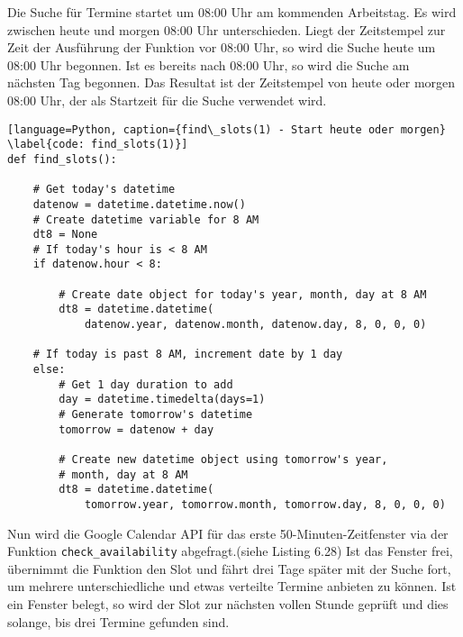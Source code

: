             Die Suche für Termine startet um 08:00 Uhr am kommenden Arbeitstag. Es wird zwischen heute und morgen 08:00 Uhr unterschieden. Liegt der Zeitstempel zur Zeit der Ausführung der Funktion vor 08:00 Uhr, so wird die Suche heute um 08:00 Uhr begonnen. Ist es bereits nach 08:00 Uhr, so wird die Suche am nächsten Tag begonnen. Das Resultat ist der Zeitstempel von heute oder morgen 08:00 Uhr, der als Startzeit für die Suche verwendet wird.

            \begin{lstlisting}[language=Python, caption={find\_slots(1) - Start heute oder morgen} \label{code: find_slots(1)}]
def find_slots():

    # Get today's datetime
    datenow = datetime.datetime.now()
    # Create datetime variable for 8 AM
    dt8 = None
    # If today's hour is < 8 AM
    if datenow.hour < 8:

        # Create date object for today's year, month, day at 8 AM
        dt8 = datetime.datetime(
            datenow.year, datenow.month, datenow.day, 8, 0, 0, 0)

    # If today is past 8 AM, increment date by 1 day
    else:
        # Get 1 day duration to add
        day = datetime.timedelta(days=1)
        # Generate tomorrow's datetime
        tomorrow = datenow + day

        # Create new datetime object using tomorrow's year, 
        # month, day at 8 AM
        dt8 = datetime.datetime(
            tomorrow.year, tomorrow.month, tomorrow.day, 8, 0, 0, 0)
            \end{lstlisting}

            Nun wird die Google Calendar API für das erste 50-Minuten-Zeitfenster via der Funktion \verb|check_availability| abgefragt.(siehe Listing 6.28) Ist das Fenster frei, übernimmt die Funktion den Slot und fährt drei Tage später mit der Suche fort, um mehrere unterschiedliche und etwas verteilte Termine anbieten zu können. Ist ein Fenster belegt, so wird der Slot zur nächsten vollen Stunde geprüft und dies solange, bis drei Termine gefunden sind.

